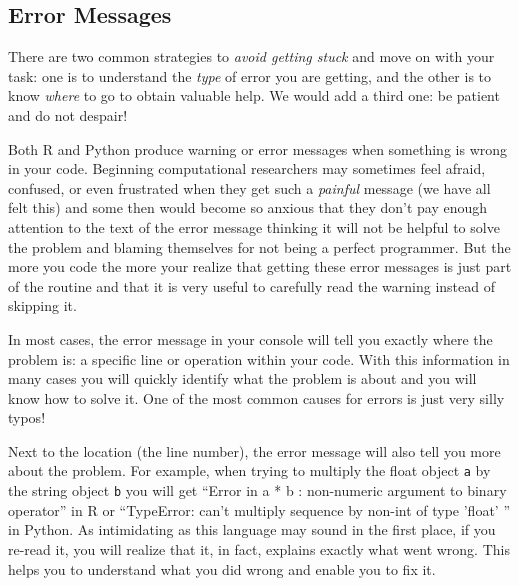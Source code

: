 \subsection{Error Messages}


There are two common strategies to \textit{avoid getting stuck} and move on with your task: one is to understand the \textit{type} of error you are getting, and the other is to know \textit{where} to go to obtain valuable help. We would add a third one: be patient and do not despair!

Both R and Python produce warning or error messages when something is wrong in your code. Beginning computational researchers may sometimes feel afraid, confused, or even frustrated when they get such a \textit{painful} message (we have all felt this) and some then would become so anxious that they don't pay enough attention to the text of the error message thinking it will not be helpful to solve the problem and blaming themselves for not being a perfect programmer. But the more you code the more your realize that getting these error messages is just part of the routine and that it is very useful to carefully read the warning instead of skipping it.

In most cases, the error message in your console will tell you exactly where the problem is: a specific line or operation within your code. With this information in many cases you will quickly identify what the problem is about and you will know how to solve it. One of the most common causes for  errors is just very silly typos!

Next to the location (the line number), the error message will also tell you more about the problem. For example, when trying to multiply the float object \texttt{a} by the string object \texttt{b} you will get ``Error in a * b : non-numeric argument to binary operator'' in R or ``TypeError: can't multiply sequence by non-int of type 'float' '' in Python. As intimidating as this language may sound in the first place, if you re-read it, you will realize that it, in fact, explains exactly what went wrong. This helps you to understand what you did wrong and enable you to fix it.



